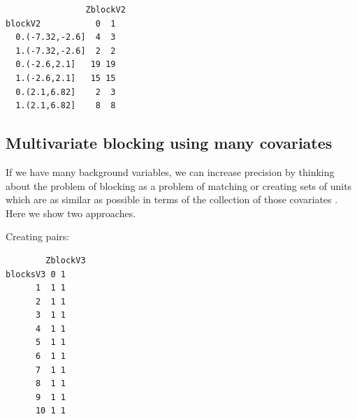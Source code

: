 \documentclass[
  12pt,
]{book}
\newenvironment{Shaded}{\begin{snugshade}}{\end{snugshade}}
\newcommand{\AttributeTok}[1]{\textcolor[rgb]{0.77,0.63,0.00}{#1}}
\newcommand{\DecValTok}[1]{\textcolor[rgb]{0.00,0.00,0.81}{#1}}
\newcommand{\DocumentationTok}[1]{\textcolor[rgb]{0.56,0.35,0.01}{\textbf{\textit{#1}}}}
\newcommand{\FunctionTok}[1]{\textcolor[rgb]{0.00,0.00,0.00}{#1}}
\newcommand{\NormalTok}[1]{#1}
\newcommand{\OtherTok}[1]{\textcolor[rgb]{0.56,0.35,0.01}{#1}}
\newcommand{\SpecialCharTok}[1]{\textcolor[rgb]{0.00,0.00,0.00}{#1}}
\newcommand{\StringTok}[1]{\textcolor[rgb]{0.31,0.60,0.02}{#1}}
\theoremstyle{definition}
\theoremstyle{definition}
\theoremstyle{definition}
\theoremstyle{remark}
\begin{document}
\begin{verbatim}
                ZblockV2
blockV2           0  1
  0.(-7.32,-2.6]  4  3
  1.(-7.32,-2.6]  2  2
  0.(-2.6,2.1]   19 19
  1.(-2.6,2.1]   15 15
  0.(2.1,6.82]    2  3
  1.(2.1,6.82]    8  8
\end{verbatim}

\hypertarget{multivariate-blocking-using-many-covariates}{%
\subsection{Multivariate blocking using many
covariates}\label{multivariate-blocking-using-many-covariates}}

If we have many background variables, we can increase precision by
thinking about the problem of blocking as a problem of matching or
creating sets of units which are as similar as possible in terms of the
collection of those covariates
\citep{moore2012multivariate, moore2016bT063}. Here we show two
approaches.

Creating pairs:

\begin{Shaded}
\end{Shaded}

\begin{verbatim}
        ZblockV3
blocksV3 0 1
      1  1 1
      2  1 1
      3  1 1
      4  1 1
      5  1 1
      6  1 1
      7  1 1
      8  1 1
      9  1 1
      10 1 1
\end{verbatim}
\end{document}
